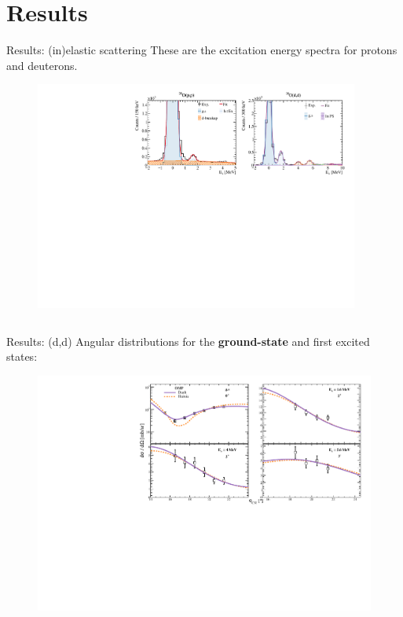 \documentclass[aspectratio=43, dvipsnames]{beamer}
\newcommand{\iso}[2]{\ce{^{#1}#2}}
\begin{document}
\section{Results}
\begin{frame}{Results: (in)elastic scattering}
	These are the excitation energy spectra for protons and deuterons.
	\begin{figure}
		\includegraphics[width=0.95\textwidth]{figures/elastic_xs.pdf}
	\end{figure}
	\begin{columns}[c]
		\begin{column}{0.45\linewidth}
		\end{column}%
		\begin{column}{0.45\linewidth}
		\end{column}
	\end{columns}
\end{frame}

\begin{frame}{Results: \iso{20}{O}(d,d)}
	Angular distributions for the \textbf{ground-state} and first excited states:
	\begin{figure}
		\includegraphics[width=0.85\linewidth]{figures/d_ang.pdf}
	\end{figure}
\end{frame}
\end{document}
